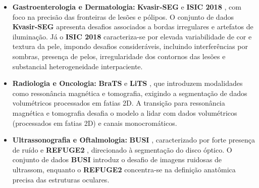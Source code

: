 \begin{itemize}

\item \textbf{Gastroenterologia e Dermatologia:} \textbf{Kvasir-SEG} \cite{jha2020kvasir} e \textbf{ISIC 2018} \cite{codella2018skin}, com foco na precisão das fronteiras de lesões e pólipos. O conjunto de dados \textbf{Kvasir-SEG} apresenta desafios associados a bordas irregulares e artefatos de iluminação. Já o \textbf{ISIC 2018} caracteriza-se por elevada variabilidade de cor e textura da pele, impondo desafios consideráveis, incluindo interferências por sombras, presença de pelos, irregularidade dos contornos das lesões e substancial heterogeneidade interpaciente. %

\item \textbf{Radiologia e Oncologia:} \textbf{BraTS} \cite{menze2014multimodal} e \textbf{LiTS} \cite{bilic2019liver}, que introduzem modalidades como ressonância magnética e tomografia, exigindo a segmentação de dados volumétricos processados em fatias 2D. A transição para ressonância magnética e tomografia desafia o modelo a lidar com dados volumétricos (processados em fatias 2D) e canais monocromáticos.

\item \textbf{Ultrassonografia e Oftalmologia:} \textbf{BUSI} \cite{al2020dataset}, caracterizado por forte presença de ruído e \textbf{REFUGE2} \cite{fang2022refuge2}, direcionado à segmentação do disco óptico. O conjunto de dados \textbf{BUSI} introduz o desafio de imagens ruidosas de ultrassom, enquanto o \textbf{REFUGE2} \cite{fang2022refuge2} concentra-se na definição anatômica precisa das estruturas oculares.
\end{itemize}


